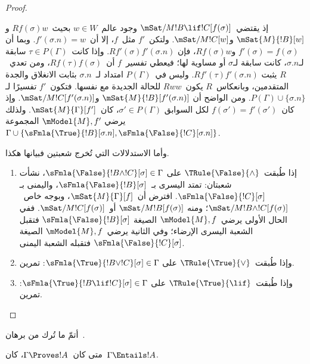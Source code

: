 \documentclass[../../../include/open-logic-section]{subfiles}
\begin{document}
\begin{proof}
\begin{enumerate}
  إذ يقتضي~$\mSat/{M}{!B \lif !C}[f(\sigma)]$ وجود عالم~$w \in W$
  بحيث~$Rf(\sigma)w$ و$\mSat{M}{!B}[w]$ و$\mSat/{M}{!C}[w]$.
  ولتكن~$f'$ مثل~$f$، إلا أن~$f'(\sigma.n) = w$. وبما أن
  $f'(\sigma) = f(\sigma)$ و$Rf(\sigma)w$، فإن
  $Rf'(\sigma)f'(\sigma.n)$. وإذا كانت~$\tau\in P(\Gamma)$ سابقة
  لـ$\sigma.n$، كانت سابقة لـ$\sigma$ أو مساوية لها؛ فيعطي تفسير~$f$
  أن~$Rf(\tau)f(\sigma)$، ومن تعدي~$R$ يثبت
  $Rf'(\tau)f'(\sigma.n)$. وليس في~$P(\Gamma)$ امتداد لـ~$\sigma.n$
  بثابت الانغلاق والجدة المتقدمين، وبانعكاس~$R$ يكون~$Rww$ للحالة
  الجديدة مع نفسها. فتكون~$f'$ تفسيرًا لـ
  $P(\Gamma) \cup \{\sigma.n\}$. ومن الواضح أن
  $\mSat{M}{!B}[f'(\sigma.n)]$ و$\mSat/{M}{!C}[f'(\sigma.n)]$.
  وإذ كان~$f(\sigma') = f'(\sigma')$ لكل السوابق
  $\sigma' \in P(\Gamma)$، كان~$\mSat{M}{\Gamma}[f']$. ولذلك يرضي
  $\mModel{M}, f'$ المجموعة
  $\Gamma \cup \{\sFmla{\True}{!B}[\sigma.n],
  \sFmla{\False}{!C}[\sigma.n]\}$.
\end{enumerate}
وأما الاستدلالات التي تُخرج شعبتين فبيانها هكذا.
\begin{enumerate}
\item إذا طُبقت~$\TRule{\False}{\land}$ على
  $\sFmla{\False}{!B \land !C}[\sigma] \in \Gamma$، نشأت شعبتان:
  تمتد اليسرى بـ~$\sFmla{\False}{!B}[\sigma]$، واليمنى بـ
  $\sFmla{\False}{!C}[\sigma]$. افترض أن~$\mSat{M}{\Gamma}[f]$،
  وبوجه خاص~$\mSat/{M}{!B \land !C}[f(\sigma)]$؛ ومنه
  $\mSat/{M}{!B}[f(\sigma)]$ أو~$\mSat/{M}{!C}[f(\sigma)]$.
  ففي الحال الأولى يرضي~$\mModel{M}, f$ الصيغة
  $\sFmla{\False}{!B}[\sigma]$ فتقبل الشعبة اليسرى الإرضاء؛ وفي
  الثانية يرضي~$\mModel{M}, f$ الصيغة
  $\sFmla{\False}{!C}[\sigma]$ فتقبله الشعبة اليمنى.
\item وإذا طُبقت~$\TRule{\True}{\lor}$ على
    $\sFmla{\True}{!B \lor !C}[\sigma] \in \Gamma$: تمرين.
\item وإذا طُبقت~$\TRule{\True}{\lif}$ على
    $\sFmla{\True}{!B \lif !C}[\sigma] \in \Gamma$: تمرين.
\end{enumerate}
\end{proof}

\begin{prob}
أتمّ ما تُرك من برهان~.
\end{prob}

\begin{cor}
متى كان~$\Gamma \Proves !A$، كان~$\Gamma \Entails !A$.
\end{cor}
\end{document}
